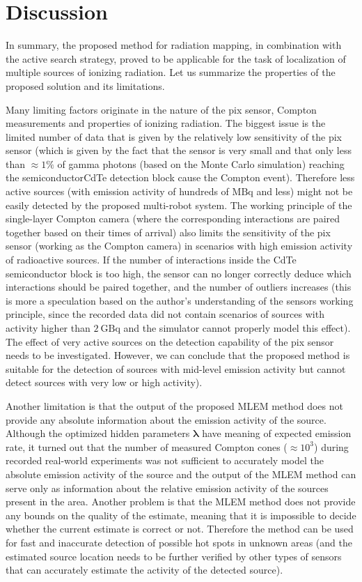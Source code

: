 \section{Discussion}
In summary, the proposed method for radiation mapping, in combination with the active search strategy, proved to be applicable for the task of localization of multiple sources of ionizing radiation.
Let us summarize the properties of the proposed solution and its limitations.

Many limiting factors originate in the nature of the \ac{pix} sensor, Compton measurements and properties of ionizing radiation.
The biggest issue is the limited number of data that is given by the relatively low sensitivity of the \ac{pix} sensor (which is given by the fact that the sensor is very small and that only less than $\approx 1\%$ of gamma photons (based on the Monte Carlo simulation) reaching the semiconductor\ac{CdTe} detection block cause the Compton event).
Therefore less active sources (with emission activity of hundreds of $\si{\mega\becquerel}$ and less) might not be easily detected by the proposed multi-robot system.
The working principle of the single-layer Compton camera (where the corresponding interactions are paired together based on their times of arrival) 
also limits the sensitivity of the \ac{pix} sensor (working as the Compton camera) in scenarios with high emission activity of radioactive sources.
If the number of interactions inside the \ac{CdTe} semiconductor block is too high, the sensor can no longer correctly deduce which interactions should be paired together, and the number of outliers increases (this is more a speculation based on the author's understanding of the sensors working principle, since the recorded data did not contain scenarios of sources with activity higher than $\SI{2}{\giga\becquerel}$ and the simulator cannot properly model this effect).
The effect of very active sources on the detection capability of the \ac{pix} sensor needs to be investigated.
However, we can conclude that the proposed method is suitable for the detection of sources with mid-level emission activity but cannot detect sources with very low or high activity).

Another limitation is that the output of the proposed \ac{MLEM} method does not provide any absolute information about the emission activity of the source.
Although the optimized hidden parameters $\bm{\lambda}$ have meaning of expected emission rate, 
it turned out that the number of measured Compton cones ($\approx 10^3$) during recorded real-world experiments was not sufficient to accurately model the absolute emission activity of the source
and the output of the \ac{MLEM} method can serve only as information about the relative emission activity of the sources present in the area.
Another problem is that the \ac{MLEM} method does not provide any bounds on the quality of the estimate, meaning that it is impossible to decide whether the current estimate is correct or not.
Therefore the method can be used for fast and inaccurate detection of possible hot spots in unknown areas (and the estimated source location needs to be further verified by other types of sensors that can accurately estimate the activity of the detected source).

